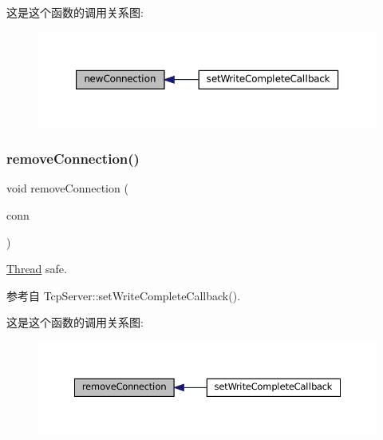 这是这个函数的调用关系图\+:
\nopagebreak
\begin{figure}[H]
\begin{center}
\leavevmode
\includegraphics[width=350pt]{classmuduo_1_1net_1_1TcpServer_a6e7510f45cfa67ddc79aa8689fd79562_icgraph}
\end{center}
\end{figure}
\mbox{\label{classmuduo_1_1net_1_1TcpServer_ad9661c3f05443256c9439f812d1a7691}} 
\subsubsection{\texorpdfstring{remove\+Connection()}{removeConnection()}}
{\footnotesize\ttfamily void remove\+Connection (\begin{DoxyParamCaption}\item[{const \hyperlink{namespacemuduo_1_1net_ab91a46e9290926aa692450e46cfc9039}{Tcp\+Connection\+Ptr} \&}]{conn }\end{DoxyParamCaption})\hspace{0.3cm}{\ttfamily [private]}}



\hyperlink{classmuduo_1_1Thread}{Thread} safe. 



参考自 Tcp\+Server\+::set\+Write\+Complete\+Callback().

这是这个函数的调用关系图\+:
\nopagebreak
\begin{figure}[H]
\begin{center}
\leavevmode
\includegraphics[width=350pt]{classmuduo_1_1net_1_1TcpServer_ad9661c3f05443256c9439f812d1a7691_icgraph}
\end{center}
\end{figure}
\mbox{\label{classmuduo_1_1net_1_1TcpServer_a38345725075c2bf845af025c2567d977}} 
